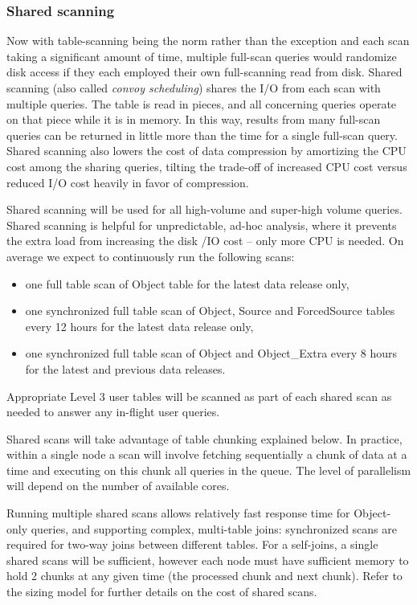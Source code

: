 \documentclass[DM,lsstdraft,toc]{lsstdoc}
\begin{document}
\subsubsection{Shared scanning}\label{shared-scanning}

Now with table-scanning being the norm rather than the exception and
each scan taking a significant amount of time, multiple full-scan
queries would randomize disk access if they each employed their own
full-scanning read from disk. Shared scanning (also called \emph{convoy
scheduling}) shares the I/O from each scan with multiple queries. The
table is read in pieces, and all concerning queries operate on that
piece while it is in memory. In this way, results from many full-scan
queries can be returned in little more than the time for a single
full-scan query. Shared scanning also lowers the cost of data
compression by amortizing the CPU cost among the sharing queries,
tilting the trade-off of increased CPU cost versus reduced I/O cost
heavily in favor of compression.

Shared scanning will be used for all high-volume and super-high volume
queries. Shared scanning is helpful for unpredictable, ad-hoc analysis,
where it prevents the extra load from increasing the disk /IO cost --
only more CPU is needed. On average we expect to continuously run the
following scans:

\begin{itemize}
\item
  one full table scan of Object table for the latest data release only,
\item
  one synchronized full table scan of Object, Source and ForcedSource
  tables every 12 hours for the latest data release only,
\item
  one synchronized full table scan of Object and Object\_Extra every 8
  hours for the latest and previous data releases.
\end{itemize}

Appropriate Level 3 user tables will be scanned as part of each shared
scan as needed to answer any in-flight user queries.

Shared scans will take advantage of table chunking explained below. In
practice, within a single node a scan will involve fetching sequentially
a chunk of data at a time and executing on this chunk all queries in the
queue. The level of parallelism will depend on the number of available
cores.

Running multiple shared scans allows relatively fast response time for
Object-only queries, and supporting complex, multi-table joins:
synchronized scans are required for two-way joins between different
tables. For a self-joins, a single shared scans will be sufficient,
however each node must have sufficient memory to hold 2 chunks at any
given time (the processed chunk and next chunk). Refer to the sizing
model  for further details on the cost of shared scans.
\end{document}
